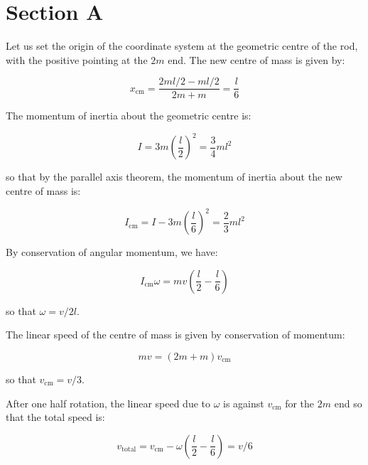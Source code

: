 \documentclass[12pt]{article}
\begin{document}



\pagebreak
\section*{Section A}



Let us set the origin of the coordinate system at the geometric centre of the rod, with the positive pointing at the $2m$ end. The new centre of mass is given by:

\begin{equation}
    x_{\text{cm}} = \frac{2ml/2 - ml/2}{2m + m} = \frac{l}{6}
\end{equation}

The momentum of inertia about the geometric centre is:

\begin{equation}
    I = 3m \left( \frac{l}{2} \right)^{2} = \frac{3}{4} ml^{2}
\end{equation}

so that by the parallel axis theorem, the momentum of inertia about the new centre of mass is:

\begin{equation}
    I_{\text{cm}} = I - 3m \left( \frac{l}{6} \right)^{2} = \frac{2}{3} ml^{2}
\end{equation}

By conservation of angular momentum, we have:

\begin{equation}
    I_{\text{cm}} \omega = mv \left( \frac{l}{2} - \frac{l}{6} \right)
\end{equation}

so that $\omega = v/2l$.

The linear speed of the centre of mass is given by conservation of momentum:

\begin{equation}
    mv = (2m + m) v_{\text{cm}}
\end{equation}

so that $v_{\text{cm}} = v/3$.

After one half rotation, the linear speed due to $\omega$ is against $v_{\text{cm}}$ for the $2m$ end so that the total speed is:

\begin{equation}
    v_{\text{total}} = v_{\text{cm}} - \omega \left( \frac{l}{2} - \frac{l}{6} \right) = v/6
\end{equation}
\end{document}
